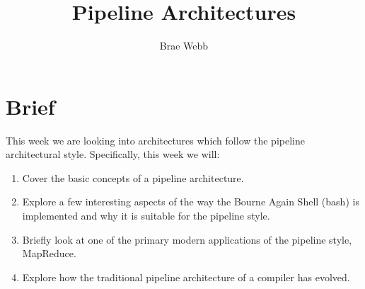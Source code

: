 \documentclass{csse4400}
\title{Pipeline Architectures}
\author{Brae Webb}
\date{\week{2}}
\begin{document}
\maketitle

\section{Brief}
This week we are looking into architectures which
follow the pipeline architectural style.
Specifically, this week we will:
\begin{enumerate}
    \item Cover the basic concepts of a pipeline architecture.
    \item Explore a few interesting aspects of the way the 
        Bourne Again Shell (bash) is implemented and why it is suitable for the 
        pipeline style.
    \item Briefly look at one of the primary modern applications of the pipeline style,
        MapReduce.
    \item Explore how the traditional pipeline architecture of a compiler has evolved.
\end{enumerate}
\end{document}
